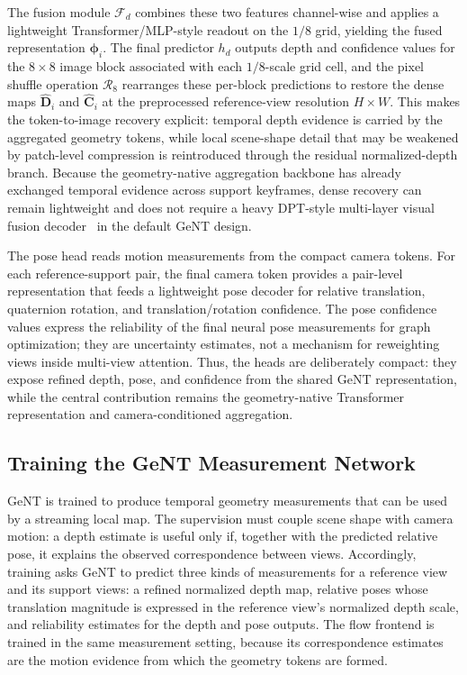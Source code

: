 The fusion module $\mathcal{F}_d$ combines these two features channel-wise and applies a lightweight Transformer/MLP-style readout on the $1/8$ grid, yielding the fused representation $\bm{\phi}_i$.
The final predictor $h_d$ outputs depth and confidence values for the $8\times8$ image block associated with each $1/8$-scale grid cell, and the pixel shuffle operation $\mathcal{R}_8$ rearranges these per-block predictions to restore the dense maps $\hat{\bm{D}}_i$ and $\hat{\bm{C}}_i$ at the preprocessed reference-view resolution $H\times W$.
This makes the token-to-image recovery explicit: temporal depth evidence is carried by the aggregated geometry tokens, while local scene-shape detail that may be weakened by patch-level compression is reintroduced through the residual normalized-depth branch.
Because the geometry-native aggregation backbone has already exchanged temporal evidence across support keyframes, dense recovery can remain lightweight and does not require a heavy DPT-style multi-layer visual fusion decoder~\cite{ranftl2021vision} in the default GeNT design.

The pose head reads motion measurements from the compact camera tokens.
For each reference-support pair, the final camera token provides a pair-level representation that feeds a lightweight pose decoder for relative translation, quaternion rotation, and translation/rotation confidence.
The pose confidence values express the reliability of the final neural pose measurements for graph optimization; they are uncertainty estimates, not a mechanism for reweighting views inside multi-view attention.
Thus, the heads are deliberately compact: they expose refined depth, pose, and confidence from the shared GeNT representation, while the central contribution remains the geometry-native Transformer representation and camera-conditioned aggregation.

\subsection{Training the GeNT Measurement Network}
GeNT is trained to produce temporal geometry measurements that can be used by a streaming local map.
The supervision must couple scene shape with camera motion: a depth estimate is useful only if, together with the predicted relative pose, it explains the observed correspondence between views.
Accordingly, training asks GeNT to predict three kinds of measurements for a reference view and its support views: a refined normalized depth map, relative poses whose translation magnitude is expressed in the reference view's normalized depth scale, and reliability estimates for the depth and pose outputs.
The flow frontend is trained in the same measurement setting, because its correspondence estimates are the motion evidence from which the geometry tokens are formed.

